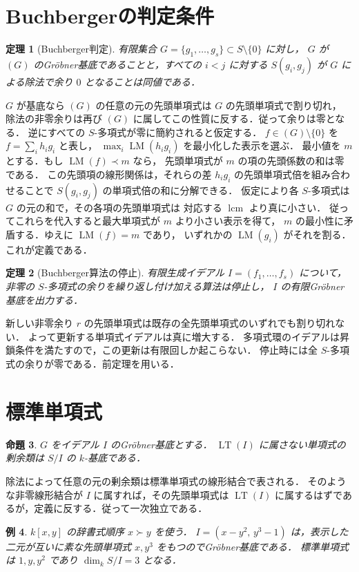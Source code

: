 \documentclass[a5paper,10pt,onecolumn]{jsarticle}
\makeatletter
\theoremstyle{mathnotetheorem}
\newtheorem{theorem}{定理}[section]
\newtheorem{proposition}[theorem]{命題}
\newtheorem{example}[theorem]{例}
\renewcommand{\proofname}{証明}
\renewenvironment{proof}[1][\proofname]{%
  \par\pushQED{\qed}\normalfont\topsep4\p@\@plus2\p@\relax
  \trivlist\item[\hskip\labelsep\bfseries #1]\ignorespaces
}{\popQED\endtrivlist\@endpefalse}
\makeatother
\begin{document}
\section{Buchbergerの判定条件}
\begin{theorem}[Buchberger判定]
有限集合 $G=\{g_1,\ldots,g_s\}\subset S\setminus\{0\}$ に対し，
$G$ が $(G)$ のGr\"obner基底であることと，すべての $i<j$ に対する
$S(g_i,g_j)$ が $G$ による除法で余り $0$ となることは同値である．
\end{theorem}
\begin{proof}
$G$ が基底なら $(G)$ の任意の元の先頭単項式は $G$ の先頭単項式で割り切れ，
除法の非零余りは再び $(G)$ に属してこの性質に反する．従って余りは零となる．
逆にすべての $S$-多項式が零に簡約されると仮定する．
$f\in(G)\setminus\{0\}$ を $f=\sum_i h_i g_i$ と表し，
$\max_i\operatorname{LM}(h_i g_i)$ を最小化した表示を選ぶ．
最小値を $m$ とする．もし $\operatorname{LM}(f)\prec m$ なら，
先頭単項式が $m$ の項の先頭係数の和は零である．
この先頭項の線形関係は，それらの差
$h_i g_i$ の先頭単項式倍を組み合わせることで
$S(g_i,g_j)$ の単項式倍の和に分解できる．
仮定により各 $S$-多項式は $G$ の元の和で，その各項の先頭単項式は
対応する $\operatorname{lcm}$ より真に小さい．
従ってこれらを代入すると最大単項式が $m$ より小さい表示を得て，
$m$ の最小性に矛盾する．ゆえに $\operatorname{LM}(f)=m$ であり，
いずれかの $\operatorname{LM}(g_i)$ がそれを割る．これが定義である．
\end{proof}
\begin{theorem}[Buchberger算法の停止]
有限生成イデアル $I=(f_1,\ldots,f_s)$ について，
非零の $S$-多項式の余りを繰り返し付け加える算法は停止し，
$I$ の有限Gr\"obner基底を出力する．
\end{theorem}
\begin{proof}
新しい非零余り $r$ の先頭単項式は既存の全先頭単項式のいずれでも割り切れない．
よって更新する単項式イデアルは真に増大する．
多項式環のイデアルは昇鎖条件を満たすので，この更新は有限回しか起こらない．
停止時には全 $S$-多項式の余りが零である．前定理を用いる．
\end{proof}
\section{標準単項式}
\begin{proposition}
$G$ をイデアル $I$ のGr\"obner基底とする．
$\operatorname{LT}(I)$ に属さない単項式の剰余類は $S/I$ の $k$-基底である．
\end{proposition}
\begin{proof}
除法によって任意の元の剰余類は標準単項式の線形結合で表される．
そのような非零線形結合が $I$ に属すれば，その先頭単項式は
$\operatorname{LT}(I)$ に属するはずであるが，定義に反する．従って一次独立である．
\end{proof}
\begin{example}
$k[x,y]$ の辞書式順序 $x\succ y$ を使う．
$I=(x-y^2,\,y^3-1)$ は，表示した二元が互いに素な先頭単項式
$x,y^3$ をもつのでGr\"obner基底である．
標準単項式は $1,y,y^2$ であり $\dim_k S/I=3$ となる．
\end{example}
\end{document}
